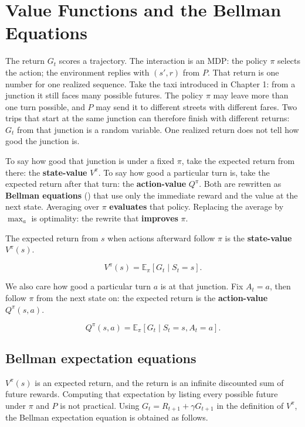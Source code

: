 \chapter{Value Functions and the Bellman Equations}

The return $G_t$ scores a trajectory. The interaction is an MDP: the policy $\pi$ selects the action; the environment replies with $(s',r)$ from $P$. That return is one number for one realized sequence. Take the taxi introduced in Chapter 1: from a junction it still faces many possible futures. The policy $\pi$ may leave more than one turn possible, and $P$ may send it to different streets with different fares. Two trips that start at the same junction can therefore finish with different returns: $G_t$ from that junction is a random variable. One realized return does not tell how good the junction is.

To say how good that junction is under a fixed $\pi$, take the expected return from there: the \textbf{state-value} $V^\pi$. To say how good a particular turn is, take the expected return after that turn: the \textbf{action-value} $Q^\pi$. Both are rewritten as \textbf{Bellman equations} () that use only the immediate reward and the value at the next state. Averaging over $\pi$ \textbf{evaluates} that policy. Replacing the average by $\max_a$ is optimality: the rewrite that \textbf{improves} $\pi$.

The expected return from $s$ when actions afterward follow $\pi$ is the \textbf{state-value} $V^\pi(s)$.

\begin{equation}
V^\pi(s) = \mathbb{E}_\pi [G_t \mid S_t = s].
\tag{2.1}
\end{equation}

We also care how good a particular turn $a$ is at that junction. Fix $A_t=a$, then follow $\pi$ from the next state on: the expected return is the \textbf{action-value} $Q^\pi(s,a)$.

\begin{equation}
Q^\pi(s,a) = \mathbb{E}_\pi [G_t \mid S_t = s, A_t = a].
\tag{2.2}
\end{equation}

\section{Bellman expectation equations}
$V^\pi(s)$ is an expected return, and the return is an infinite discounted sum of future rewards. Computing that expectation by listing every possible future under $\pi$ and $P$ is not practical. Using $G_t=R_{t+1}+\gamma G_{t+1}$ in the definition of $V^\pi$, the Bellman expectation equation is obtained as follows.

